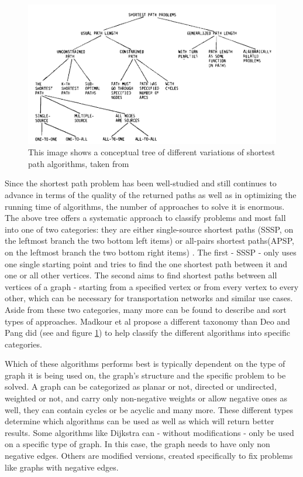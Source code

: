 \begin{figure}[ht]
	\centering
	\includegraphics[width=\linewidth]{bilder/shortest path variants tree (Shortest-path algorithms Taxonomy and annotation).png}
	\caption{This image shows a conceptual tree of different variations of shortest path algorithms, taken from \cite{deo_shortest-path_1984}}
	\label{fig:shortestPathTaxonomy}	
\end{figure}

Since the shortest path problem has been well-studied and still continues to advance in terms of the quality of the returned paths as well as in optimizing the running time of algorithms, the number of approaches to solve it is enormous.
The above tree offers a systematic approach to classify problems and most fall into one of two categories: they are either single-source shortest paths (SSSP, on the leftmost branch the two bottom left items) or all-pairs shortest paths(APSP, on the leftmost branch the two bottom right items) \cite{madkour_survey_2017}.
The first  - SSSP - only uses one single starting point and tries to find the one shortest path between it and one or all other vertices.
The second aims to find shortest paths between all vertices of a graph - starting from a specified vertex or from every vertex to every other, which can be necessary for transportation networks and similar use cases. 
Aside from these two categories, many more can be found to describe and sort types of approaches. 
Madkour et al propose a different taxonomy than Deo and Pang did (see \cite{deo_shortest-path_1984} and figure \ref{fig:shortestPathTaxonomy}) to help classify the different algorithms into specific categories. \cite{madkour_survey_2017} 

Which of these algorithms performs best is typically dependent on the type of graph it is being used on, the graph's structure and the specific problem to be solved. 
A graph can be categorized as planar or not, directed or undirected, weighted or not, and carry only non-negative weights or allow negative ones as well, they can contain cycles or be acyclic and many more. 
These different types determine which algorithms can be used as well as which will return better results.
Some algorithms like Dijkstra can - without modifications - only be used on a specific type of graph. 
In this case, the graph needs to have only non negative edges.
Others are modified versions, created specifically to fix problems like graphs with negative edges. 

